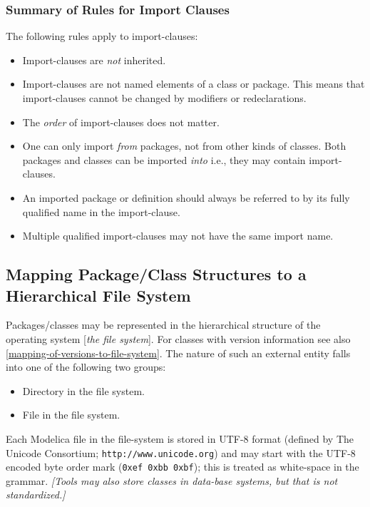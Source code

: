\subsubsection{Summary of Rules for Import Clauses}

The following rules apply to import-clauses:

\begin{itemize}
\item
  Import-clauses are \emph{not} inherited.
\item
  Import-clauses are not named elements of a class or package. This
  means that import-clauses cannot be changed by modifiers or
  redeclarations.
\item
  The \emph{order} of import-clauses does not matter.
\item
  One can only import \emph{from} packages, not from other kinds of
  classes. Both packages and classes can be imported \emph{into} i.e.,
  they may contain import-clauses.
\item
  An imported package or definition should always be referred to by its
  fully qualified name in the import-clause.
\item
  Multiple qualified import-clauses may not have the same import name.
\end{itemize}

\subsection{Mapping Package/Class Structures to a Hierarchical File System}

Packages/classes may be represented in the hierarchical structure of the
operating system {[}\emph{the file system}{]}. For classes with version
information see also \autoref{mapping-of-versions-to-file-system}. The nature of such an external
entity falls into one of the following two groups:

\begin{itemize}
\item
  Directory in the file system.
\end{itemize}

\begin{itemize}
\item
  File in the file system.
\end{itemize}

Each Modelica file in the file-system is stored in UTF-8 format (defined
by The Unicode Consortium; \lstinline!http://www.unicode.org!) and may start with
the UTF-8 encoded byte order mark (\lstinline!0xef 0xbb 0xbf!); this is treated as
white-space in the grammar. \emph{{[}Tools may also store classes in
data-base systems, but that is not standardized.{]}}

